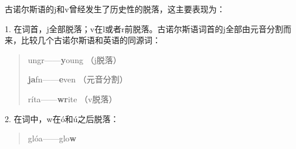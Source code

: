   古诺尔斯语的j和v曾经发生了历史性的脱落，这主要表现为：

1.
在词首，j全部脱落；v在l或者r前脱落。古诺尔斯语词首的j全部由元音分割而来，比较几个古诺尔斯语和英语的同源词：

\begin{quote}
  ungr------\textbf{y}oung （j脱落）

  \textbf{ja}fn------\textbf{e}ven （元音分割）

  ríta------\textbf{wr}ite （v脱落）
\end{quote}

2. 在词中，w在ó和ú之后脱落：

\begin{quote}
  glóa------glo\textbf{w}
\end{quote}






